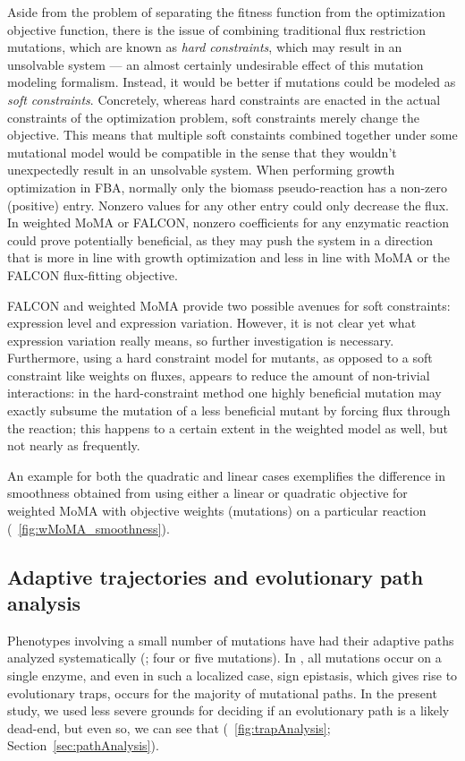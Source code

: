 Aside from the problem of separating the fitness function from the 
optimization objective function, there is the issue of combining traditional flux
restriction mutations, which are known as \emph{hard constraints}, which may
result in an unsolvable system --- an almost certainly undesirable
effect of this mutation modeling formalism. Instead, it would be
better if mutations could be modeled as \emph{soft
  constraints}. Concretely, whereas hard constraints are enacted in
the actual constraints of the optimization problem, soft constraints
merely change the objective. This means that multiple soft constaints
combined together under some mutational model would be compatible in
the sense that they wouldn't unexpectedly result in an unsolvable
system. When performing growth optimization in FBA, normally only the
biomass pseudo-reaction has a non-zero (positive) entry. Nonzero
values for any other entry could only decrease the flux. In weighted
MoMA or FALCON, nonzero coefficients for any enzymatic reaction could
prove potentially beneficial, as they may push the system in a
direction that is more in line with growth optimization and less in
line with MoMA or the FALCON flux-fitting objective.

FALCON and weighted MoMA provide two possible avenues for soft constraints:
expression level and expression variation. However, it is not clear
yet what expression variation really means, so further investigation
is necessary. Furthermore, using a hard constraint model for mutants,
as opposed to a soft constraint like weights on fluxes, appears to
reduce the amount of non-trivial interactions: in the hard-constraint
method one highly beneficial mutation may exactly subsume the mutation
of a less beneficial mutant by forcing flux through the reaction; this
happens to a certain extent in the weighted model as well, but not
nearly as frequently.

An example for both the quadratic and linear cases exemplifies the
difference in smoothness obtained from using either a linear or
quadratic objective for weighted MoMA with objective weights (mutations)
on a particular reaction (\Fig~\ref{fig:wMoMA_smoothness}).


\subsection{Adaptive trajectories and evolutionary path analysis}

Phenotypes involving a small number of mutations have had their
adaptive paths analyzed systematically (\citep{Poelwijk2007,Weinreich2006, 
Khan2011, Chou2011}; four or five mutations). In \citet{Weinreich2006}, all
mutations occur on a single enzyme, and even in such a localized case,
sign epistasis, which gives rise to evolutionary traps, occurs for the
majority of mutational paths. In the present study, we used less
severe grounds for deciding if an evolutionary path is a likely
dead-end, but even so, we can see that (\Fig~\ref{fig:trapAnalysis};
\suppOrApp Section~\ref{sec:pathAnalysis}).


